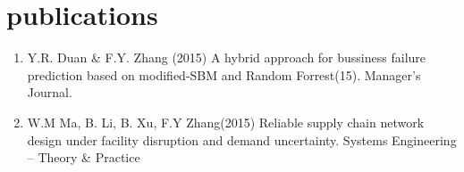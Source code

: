 \documentclass[]{friggeri-cv} %
\begin{document}
\section{publications}
\begin{enumerate}
    \item Y.R. Duan \& F.Y. Zhang (2015) A hybrid approach for bussiness failure prediction based on modified-SBM and Random Forrest(15). Manager's Journal.
    \item W.M Ma, B. Li, B. Xu, F.Y Zhang(2015) Reliable supply chain network design under facility disruption and demand uncertainty. Systems Engineering – Theory \& Practice
\end{enumerate}


%
%
%
%
%

\end{document}
